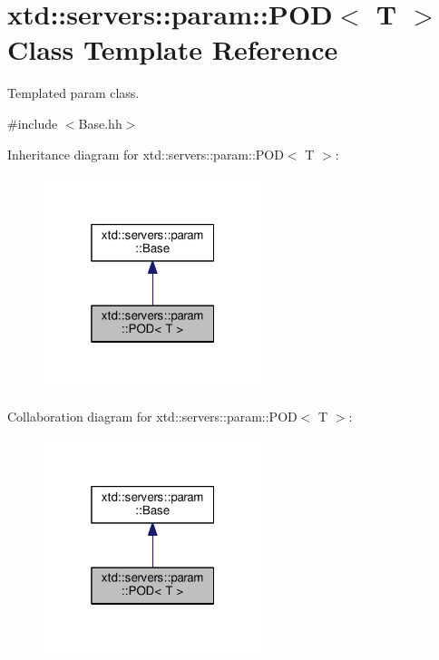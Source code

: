 \hypertarget{classxtd_1_1servers_1_1param_1_1POD}{}\section{xtd\+:\+:servers\+:\+:param\+:\+:P\+OD$<$ T $>$ Class Template Reference}
\label{classxtd_1_1servers_1_1param_1_1POD}


Templated param class.  




{\ttfamily \#include $<$Base.\+hh$>$}



Inheritance diagram for xtd\+:\+:servers\+:\+:param\+:\+:P\+OD$<$ T $>$\+:
\nopagebreak
\begin{figure}[H]
\begin{center}
\leavevmode
\includegraphics[width=181pt]{classxtd_1_1servers_1_1param_1_1POD__inherit__graph}
\end{center}
\end{figure}


Collaboration diagram for xtd\+:\+:servers\+:\+:param\+:\+:P\+OD$<$ T $>$\+:
\nopagebreak
\begin{figure}[H]
\begin{center}
\leavevmode
\includegraphics[width=181pt]{classxtd_1_1servers_1_1param_1_1POD__coll__graph}
\end{center}
\end{figure}
